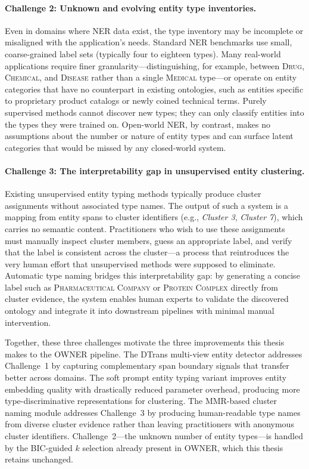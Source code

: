 \documentclass[14pt]{extreport}
\begin{document}
\paragraph{Challenge 2: Unknown and evolving entity type inventories.}
Even in domains where NER data exist, the type inventory may be incomplete or misaligned with the application's needs. Standard NER benchmarks use small, coarse-grained label sets (typically four to eighteen types). Many real-world applications require finer granularity---distinguishing, for example, between \textsc{Drug}, \textsc{Chemical}, and \textsc{Disease} rather than a single \textsc{Medical} type---or operate on entity categories that have no counterpart in existing ontologies, such as entities specific to proprietary product catalogs or newly coined technical terms. Purely supervised methods cannot discover new types; they can only classify entities into the types they were trained on. Open-world NER, by contrast, makes no assumptions about the number or nature of entity types and can surface latent categories that would be missed by any closed-world system.

\paragraph{Challenge 3: The interpretability gap in unsupervised entity clustering.}
Existing unsupervised entity typing methods typically produce cluster assignments without associated type names. The output of such a system is a mapping from entity spans to cluster identifiers (e.g., \textit{Cluster 3}, \textit{Cluster 7}), which carries no semantic content. Practitioners who wish to use these assignments must manually inspect cluster members, guess an appropriate label, and verify that the label is consistent across the cluster---a process that reintroduces the very human effort that unsupervised methods were supposed to eliminate. Automatic type naming bridges this interpretability gap: by generating a concise label such as \textsc{Pharmaceutical Company} or \textsc{Protein Complex} directly from cluster evidence, the system enables human experts to validate the discovered ontology and integrate it into downstream pipelines with minimal manual intervention.

Together, these three challenges motivate the three improvements this thesis makes to the OWNER pipeline. The DTrans multi-view entity detector addresses Challenge~1 by capturing complementary span boundary signals that transfer better across domains. The soft prompt entity typing variant improves entity embedding quality with drastically reduced parameter overhead, producing more type-discriminative representations for clustering. The MMR-based cluster naming module addresses Challenge~3 by producing human-readable type names from diverse cluster evidence rather than leaving practitioners with anonymous cluster identifiers. Challenge~2---the unknown number of entity types---is handled by the BIC-guided $k$ selection already present in OWNER, which this thesis retains unchanged.
\end{document}
